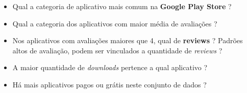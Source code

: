 \documentclass[12pt]{article}
\begin{document}
\begin{itemize}
    \item Qual a categoria de aplicativo mais comum na \textbf{Google Play Store} ?
    \item Qual a categoria dos aplicativos com maior média de avaliações ?
    \item Nos aplicativos com avaliações maiores que 4, qual de \textbf{reviews} ? Padrões altos de avaliação, podem ser vinculados a quantidade de \textit{reviews} ?
    \item A maior quantidade de \textit{downloads} pertence a qual aplicativo ?
    \item Há mais aplicativos pagos ou grátis neste conjunto de dados ?
\end{itemize}



% 
% 
\end{document}
